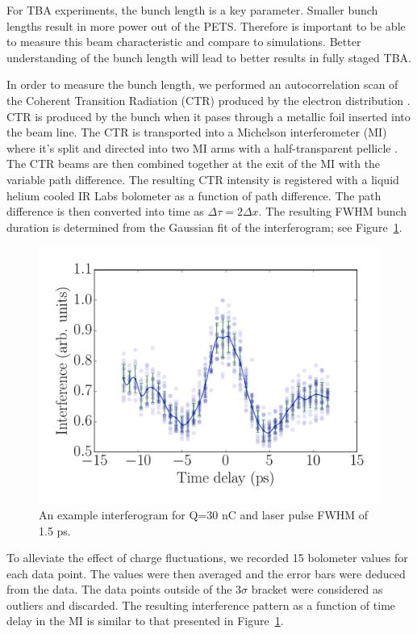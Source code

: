 \label{sec:bunchlength}

For TBA experiments, the bunch length is a key parameter.
Smaller bunch lengths result in more power out of the PETS. 
Therefore is important to be able to measure this beam characteristic 
and compare to simulations. Better understanding of the bunch length
will lead to better results in fully staged TBA.

In order to measure the bunch length, we performed an autocorrelation scan
of the Coherent Transition Radiation (CTR) produced by the electron distribution \cite{Happek, WBarry}.
CTR is produced by the bunch when it pases through a metallic foil inserted into the beam line. 
The CTR is transported into a Michelson interferometer (MI)
where it's split and directed into two MI arms with a half-transparent pellicle \cite{PhysRevSTAB.9.082801}. 
The CTR beams are then combined together at the exit of the MI with the variable path difference.
The resulting CTR intensity is registered with a liquid helium cooled IR Labs
bolometer \cite{IRlabs} as a function of path difference.
The path difference is then converted into time as $\Delta \tau = 2 \Delta x$.
The resulting FWHM bunch duration is determined from the Gaussian fit of 
the interferogram; see Figure~\ref{interferogram}.
\begin{figure}
	\centering
	\includegraphics[width=0.75\linewidth]{images/THPMF048f1}
	\caption{An example interferogram for Q=30 nC and laser pulse FWHM of 1.5 ps.}
	\label{interferogram}
\end{figure}
To alleviate the effect of charge fluctuations, we recorded 15 bolometer values for each data point.
The values were then averaged and the error bars were deduced from the data. The data points
outside of the 3$\sigma$ bracket were considered as outliers and discarded. The resulting
interference pattern as a function of time delay in the MI is similar to that presented in Figure~\ref{interferogram}.


